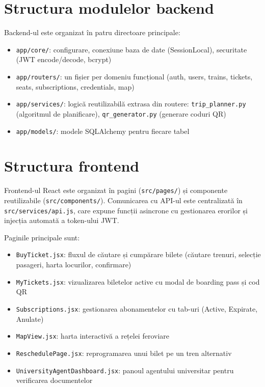\documentclass[12pt,a4paper]{report}
\begin{document}
\section{Structura modulelor backend}

Backend-ul este organizat în patru directoare principale:

\begin{itemize}
  \item \texttt{app/core/}: configurare, conexiune baza de date (SessionLocal), securitate (JWT encode/decode, bcrypt)
  \item \texttt{app/routers/}: un fișier per domeniu funcțional (auth, users, trains, tickets, seats, subscriptions, credentials, map)
  \item \texttt{app/services/}: logică reutilizabilă extrasa din routere: \texttt{trip\_planner.py} (algoritmul de planificare), \texttt{qr\_generator.py} (generare coduri QR)
  \item \texttt{app/models/}: modele SQLAlchemy pentru fiecare tabel
\end{itemize}

\section{Structura frontend}

Frontend-ul React este organizat în pagini (\texttt{src/pages/}) și componente reutilizabile (\texttt{src/components/}). Comunicarea cu API-ul este centralizată în \texttt{src/services/api.js}, care expune funcții asincrone cu gestionarea erorilor și injecția automată a token-ului JWT.

Paginile principale sunt:
\begin{itemize}
  \item \texttt{BuyTicket.jsx}: fluxul de căutare și cumpărare bilete (căutare trenuri, selecție pasageri, harta locurilor, confirmare)
  \item \texttt{MyTickets.jsx}: vizualizarea biletelor active cu modal de boarding pass și cod QR
  \item \texttt{Subscriptions.jsx}: gestionarea abonamentelor cu tab-uri (Active, Expirate, Anulate)
  \item \texttt{MapView.jsx}: harta interactivă a rețelei feroviare
  \item \texttt{ReschedulePage.jsx}: reprogramarea unui bilet pe un tren alternativ
  \item \texttt{UniversityAgentDashboard.jsx}: panoul agentului universitar pentru verificarea documentelor
\end{itemize}
\end{document}
